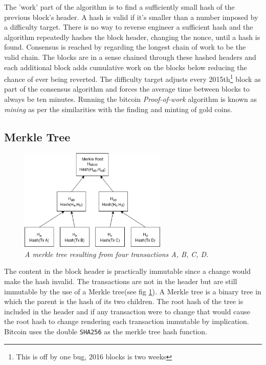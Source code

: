 The 'work' part of the algorithm is to find a sufficiently small hash of the previous block's header. A hash is valid if it's smaller than a number imposed by a difficulty target. There is no way to reverse engineer a sufficient hash and the algorithm repeatedly hashes the block header, changing the nonce, until a hash is found. Consensus is reached by regarding the longest chain of work to be the valid chain. The blocks are in a sense chained through these hashed headers and each additional block adds cumulative work on the blocks below reducing the chance of ever being reverted. The difficulty target adjusts every 2015th\footnote{This is off by one bug, 2016 blocks is two weeks} block\cite{repository:bitcoin} as part of the consensus algorithm and forces the average time between blocks to always be ten minutes. Running the bitcoin \textit{Proof-of-work} algorithm is known as \textit{mining} as per the similarities with the finding and minting of gold coins.

\subsection{Merkle Tree}

\begin{figure}[!htb]
	
	\centering
	\includegraphics[width=7cm]{images/merkle.png}
	\caption{\textit{A merkle tree resulting from four transactions A, B, C, D.
	}}
	\label{fig:merkle:tree}
	
\end{figure}

The content in the block header is practically immutable since a change would make the hash invalid. The transactions are not in the header but are still immutable by the use of a Merkle tree(see fig \ref{fig:merkle:tree}). A Merkle tree is a binary tree in which the parent is the hash of its two children. The root hash of the tree is included in the header and if any transaction were to change that would cause the root hash to change rendering each transaction immutable by implication. Bitcoin uses the double \texttt{SHA256} as the merkle tree hash function.

